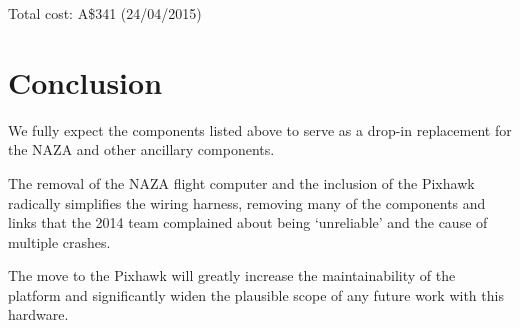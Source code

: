 \documentclass[a4paper, 11pt, titlepage]{article}
\begin{document}
Total cost: A\$341 (24/04/2015)

 \section{Conclusion}
 We fully expect the components listed above to serve as a drop-in replacement for the NAZA and other ancillary components.

The removal of the NAZA flight computer and the inclusion of the Pixhawk radically simplifies the wiring harness, removing many of the components and links that the 2014 team complained about being ‘unreliable’ and the cause of multiple crashes.

The move to the Pixhawk will greatly increase the maintainability of the platform and significantly widen the plausible scope of any future work with this hardware.

 

\renewcommand{\refname}{References}
\singlespacing


%

\end{document}
